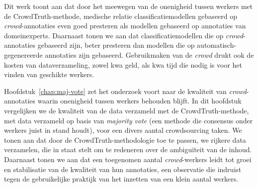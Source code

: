 Dit werk toont aan dat door het meewegen van de onenigheid tussen werkers met de CrowdTruth-methode, medische relatie classificatiemodellen gebaseerd op \emph{crowd}-annotaties even goed presteren als modellen gebaseerd op annotaties van domeinexperts. 
Daarnaast tonen we aan dat classificatiemodellen die op \emph{crowd}-annotaties gebaseerd zijn, beter presteren dan modellen die op automatisch-gegenereerde annotaties zijn gebaseerd. 
Gebruikmaken van de \emph{crowd} drukt ook de kosten van dataverzameling, zowel kwa geld, als kwa tijd die nodig is voor het vinden van geschikte werkers. 

Hoofdstuk~\ref{chap:maj-vote} zet het onderzoek voort naar de kwaliteit van \emph{crowd}-annotaties waarin onenigheid tussen werkers behouden blijft. 
In dit hoofdstuk vergelijken we de kwaliteit van de data verzameld met de CrowdTruth-methode, met data verzameld op basis van \emph{majority vote} (een methode die consensus onder werkers juist in stand houdt), voor een divers aantal crowdsourcing taken. 
We tonen aan dat door de CrowdTruth-methodologie toe te passen, we rijkere data verzamelen, die in staat stelt om te redeneren over de ambiguïteit van de inhoud. 
Daarnaast tonen we aan dat een toegenomen aantal \emph{crowd}-werkers leidt tot groei en stabilisatie van de kwaliteit van hun annotaties, een observatie die indruist tegen de gebruikelijke praktijk van het inzetten van een klein aantal werkers. 

